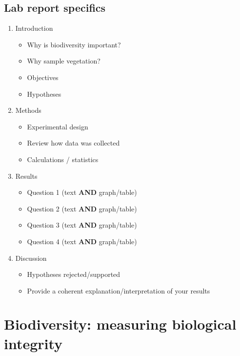 \documentclass[]{book}
\providecommand{\tightlist}{%
  \setlength{\itemsep}{0pt}\setlength{\parskip}{0pt}}
\begin{document}
\pagebreak

\hypertarget{lab-report-specifics-2}{%
\section{Lab report specifics}\label{lab-report-specifics-2}}

\begin{enumerate}
\def\labelenumi{\arabic{enumi}.}
\tightlist
\item
  Introduction

  \begin{itemize}
  \tightlist
  \item
    Why is biodiversity important?
  \item
    Why sample vegetation?
  \item
    Objectives
  \item
    Hypotheses
  \end{itemize}
\item
  Methods

  \begin{itemize}
  \tightlist
  \item
    Experimental design
  \item
    Review how data was collected
  \item
    Calculations / statistics
  \end{itemize}
\item
  Results

  \begin{itemize}
  \tightlist
  \item
    Question 1 (text \textbf{AND} graph/table)
  \item
    Question 2 (text \textbf{AND} graph/table)
  \item
    Question 3 (text \textbf{AND} graph/table)
  \item
    Question 4 (text \textbf{AND} graph/table)
  \end{itemize}
\item
  Discussion

  \begin{itemize}
  \tightlist
  \item
    Hypotheses rejected/supported
  \item
    Provide a coherent explanation/interpretation of your results
  \end{itemize}
\end{enumerate}

\hypertarget{biodiversity-measuring-biological-integrity}{%
\chapter{Biodiversity: measuring biological integrity}\label{biodiversity-measuring-biological-integrity}}
\end{document}
